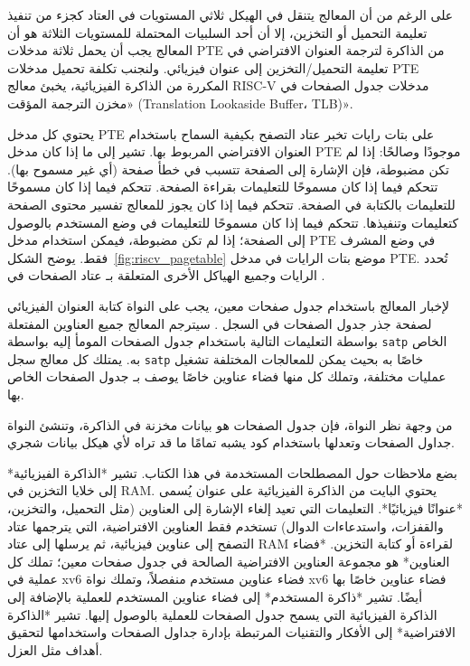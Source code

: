 على الرغم من أن المعالج يتنقل في الهيكل ثلاثي المستويات في العتاد كجزء من تنفيذ تعليمة التحميل أو التخزين، إلا أن أحد السلبيات المحتملة للمستويات الثلاثة هو أن المعالج يجب أن يحمل ثلاثة مدخلات PTE من الذاكرة لترجمة العنوان الافتراضي في تعليمة التحميل/التخزين إلى عنوان فيزيائي.
ولنجنب تكلفة تحميل مدخلات PTE المكررة من الذاكرة الفيزيائية، يخبئ معالج RISC-V مدخلات جدول الصفحات في
«مخزن الترجمة المؤقت (Translation Lookaside Buffer، TLB)».

يحتوي كل مدخل PTE على بتات رايات تخبر عتاد التصفح بكيفية السماح باستخدام العنوان الافتراضي المربوط بها.
تشير  إلى ما إذا كان مدخل PTE موجودًا وصالحًا: إذا لم تكن مضبوطة، فإن الإشارة إلى الصفحة تتسبب في خطأ صفحة (أي غير مسموح بها).
تتحكم  فيما إذا كان مسموحًا للتعليمات بقراءة الصفحة.
تتحكم  فيما إذا كان مسموحًا للتعليمات بالكتابة في الصفحة.
تتحكم  فيما إذا كان يجوز للمعالج تفسير محتوى الصفحة كتعليمات وتنفيذها.
تتحكم  فيما إذا كان مسموحًا للتعليمات في وضع المستخدم بالوصول إلى الصفحة؛
إذا لم تكن  مضبوطة، فيمكن استخدام مدخل PTE في وضع المشرف فقط.
يوضح الشكل~\ref{fig:riscv_pagetable} موضع بتات الرايات في مدخل PTE.
تُحدد الرايات وجميع الهياكل الأخرى المتعلقة بـ عتاد الصفحات في .

لإخبار المعالج باستخدام جدول صفحات معين، يجب على النواة كتابة العنوان الفيزيائي لصفحة جذر جدول الصفحات في السجل
.
سيترجم المعالج جميع العناوين المفتعلة بواسطة التعليمات التالية باستخدام جدول الصفحات المومأ إليه بواسطة \texttt{satp} الخاص به.
يمتلك كل معالج سجل \texttt{satp} خاصًا به بحيث يمكن للمعالجات المختلفة تشغيل عمليات مختلفة، وتملك كل منها فضاء عناوين خاصًا يوصف بـ جدول الصفحات الخاص بها.

من وجهة نظر النواة، فإن جدول الصفحات هو بيانات مخزنة في الذاكرة، وتنشئ النواة جداول الصفحات وتعدلها باستخدام كود يشبه تمامًا ما قد تراه لأي هيكل بيانات شجري.

بضع ملاحظات حول المصطلحات المستخدمة في هذا الكتاب. تشير *الذاكرة الفيزيائية* إلى خلايا التخزين في RAM. يحتوي البايت من الذاكرة الفيزيائية على عنوان يُسمى *عنوانًا فيزيائيًا*.
التعليمات التي تعيد إلغاء الإشارة إلى العناوين (مثل التحميل، والتخزين، والقفزات، واستدعاءات الدوال) تستخدم فقط العناوين الافتراضية، التي يترجمها عتاد التصفح إلى عناوين فيزيائية، ثم يرسلها إلى عتاد RAM لقراءة أو كتابة التخزين.
*فضاء العناوين* هو مجموعة العناوين الافتراضية الصالحة في جدول صفحات معين؛ تملك كل عملية في xv6 فضاء عناوين مستخدم منفصلاً، وتملك نواة xv6 فضاء عناوين خاصًا بها أيضًا.
تشير *ذاكرة المستخدم* إلى فضاء عناوين المستخدم للعملية بالإضافة إلى الذاكرة الفيزيائية التي يسمح جدول الصفحات للعملية بالوصول إليها.
تشير *الذاكرة الافتراضية* إلى الأفكار والتقنيات المرتبطة بإدارة جداول الصفحات واستخدامها لتحقيق أهداف مثل العزل.

